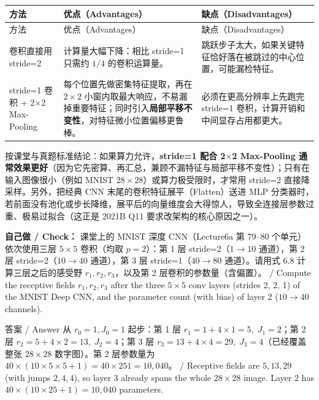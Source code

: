 \begingroup\small\setlength{\tabcolsep}{3pt}\renewcommand{\arraystretch}{1.22}
\begin{longtable}{@{}>{\raggedright\arraybackslash}p{}>{\raggedright\arraybackslash}p{}>{\raggedright\arraybackslash}p{}@{}}
\toprule
方法 & 优点（Advantages） & 缺点（Disadvantages） \\
\midrule\endfirsthead
方法 & 优点（Advantages） & 缺点（Disadvantages） \\
\midrule\endhead
\bottomrule\endfoot
卷积直接用 stride=2 & 计算量大幅下降：相比 stride=1 只需约 $1/4$ 的卷积运算量。 & 跳跃步子太大，如果关键特征恰好落在被跳过的中心位置，可能漏检特征。 \\
stride=1 卷积 + 2\ensuremath{\times}2 Max-Pooling & 每个位置先做密集特征提取，再在 $2\times 2$ 小窗内取最大响应，不易漏掉重要特征；同时引入\textbf{局部平移不变性}，对特征微小位置偏移更鲁棒。 & 必须在更高分辨率上先跑完 stride=1 卷积，计算开销和中间显存占用都更大。 \\
\end{longtable}\endgroup

按课堂与真题标准结论：如果算力允许，\textbf{stride=1 配合 2\ensuremath{\times}2 Max-Pooling 通常效果更好}（因为它先密算、再汇总，兼顾不漏特征与局部平移不变性）；只有在输入图像很小（例如 MNIST $28\times 28$）或算力极受限时，才常用 stride=2 直接降采样。另外，把经典 CNN 末尾的卷积特征展平（Flatten）送进 MLP 分类器时，若前面没有池化或步长降维，展平后的向量维度会大得惊人，导致全连接层参数过重、极易过拟合（这正是 2021B Q11 要求改架构的核心原因之一）。

\textbf{自己做 / Check：} 课堂上的 MNIST 深度 CNN（Lecture6a 第 79–80 个单元）依次使用三层 $5\times 5$ 卷积（均取 $p=2$）：第 1 层 stride=2（$1\to 10$ 通道），第 2 层 stride=2（$10\to 40$ 通道），第 3 层 stride=1（$40\to 80$ 通道）。请用式 6.8 计算三层之后的感受野 $r_1, r_2, r_3$，以及第 2 层卷积的参数量（含偏置）。 / Compute the receptive fields $r_1, r_2, r_3$ after the three $5\times 5$ conv layers (strides 2, 2, 1) of the MNIST Deep CNN, and the parameter count (with bias) of layer 2 ($10\to 40$ channels).

\begin{StudySolution}{答案 / Answer}
从 $r_0=1, J_0=1$ 起步：第 1 层 $r_1 = 1 + 4\times 1 = 5,\; J_1 = 2$；第 2 层 $r_2 = 5 + 4\times 2 = 13,\; J_2 = 4$；第 3 层 $r_3 = 13 + 4\times 4 = 29,\; J_3 = 4$（已经覆盖整张 $28\times 28$ 数字图）。第 2 层参数量为 $40\times(10\times 5\times 5 + 1) = 40\times 251 = 10{,}040$。 / Receptive fields are $5, 13, 29$ (with jumps $2, 4, 4$), so layer 3 already spans the whole $28\times 28$ image. Layer 2 has $40\times(10\times 25 + 1)=10{,}040$ parameters.
\end{StudySolution}

